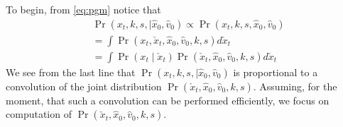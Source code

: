 \documentclass[letterpaper,10pt,conference]{ieeeconf}
\begin{document}
To begin, from \eqref{eq:pgm}  notice that
\begin{align}
	&\Pr( x_t, k,s,\mid \hat{x}_0, \hat{v}_0) \propto \Pr( x_t, k,s,\hat{x}_0, \hat{v}_0) \\
	&= \int \Pr( x_t, \check{x}_t , \hat{x}_0, \hat{v}_0, k,s) d\check{x}_t \\
	&= \int \Pr( x_t \mid \check{x}_t ) \Pr(\check{x}_t , \hat{x}_0, \hat{v}_0, k,s) d\check{x}_t \label{eq:convolve}
\end{align}
We see from the last line that $\Pr( x_t, k,s,\mid \hat{x}_0, \hat{v}_0)$ is proportional to a convolution of the joint distribution $\Pr( \check{x}_t , \hat{x}_0, \hat{v}_0, k,s)$.
Assuming, for the moment, that such a convolution can be performed efficiently, we focus on computation of $\Pr( \check{x}_t , \hat{x}_0, \hat{v}_0, k,s)$.
\end{document}
